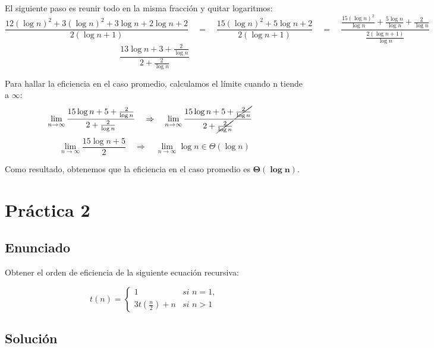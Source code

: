 \documentclass[10pt,a4paper,spanish]{report}
\begin{document}
\begin{center}
El siguiente paso es reunir todo en la misma fracción y quitar logaritmos:
\begin{displaymath}
  \frac{12(\log n)^2 + 3(\log n)^2 + 3\log n + 2\log n + 2}{2(\log n + 1)} \quad = \quad \frac{15(\log n)^2 + 5\log n + 2}{2(\log n + 1)} \quad = \quad 
  \frac{\frac{15(\log n)^2}{\log n} + \frac{5\log n}{\log n} + \frac{2}{\log n}}{\frac{2(\log n + 1)}{\log n}}
\end{displaymath}
\begin{displaymath}
  \frac{13\log n + 3 + \frac{2}{\log n}}{2 + \frac{2}{\log n}}
\end{displaymath}

Para hallar la eficiencia en el caso promedio, calculamos el límite cuando n tiende a $\infty$:
\begin{displaymath}
  \lim_{n\rightarrow \infty} \frac{15\log n + 5 + \frac{2}{\log n}}{2 + \frac{2}{\log n}} \quad \Rightarrow \quad \lim_{n\rightarrow \infty} \frac{15\log n + 5 + \cancel{\frac{2}{\log n}}}{2 + \cancel{\frac{2}{\log n}}} \quad 
\end{displaymath}
\begin{displaymath}
 \lim_{n\rightarrow \infty} \frac{15 \log n + 5}{2} \quad \Rightarrow \quad \lim_{n\rightarrow \infty} \log n \in \Theta(\log n)
\end{displaymath}
\end{center}
Como resultado, obtenemos que la eficiencia en el caso promedio es $\mathbf{\Theta(\log n)}$.

\newpage

\section{\textcolor[rgb]{0.1,0.2,1}Práctica 2}

\subsection{\textcolor[rgb]{0.1,0.2,1}Enunciado}

Obtener el orden de eficiencia de la siguiente ecuación recursiva:

\begin{equation*}
t(n) = 
\begin{cases}
1 & \textit{si } n = 1, \\
3t(\frac{n}{2}) + n & \textit{si } n > 1
\end{cases}
\end{equation*}

\subsection{\textcolor[rgb]{0.1,0.2,1}Solución}
\end{document}
